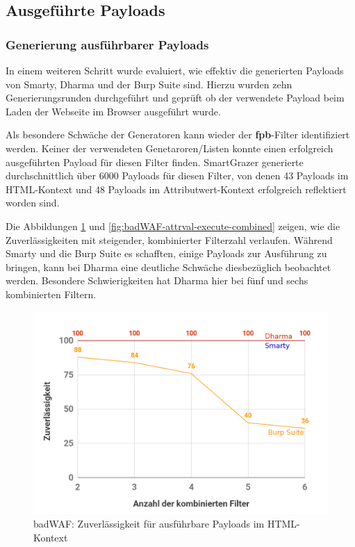 \FloatBarrier
\subsection{Ausgeführte Payloads}

\subsubsection{Generierung ausführbarer Payloads}

In einem weiteren Schritt wurde evaluiert, wie effektiv die generierten Payloads von Smarty, Dharma und der Burp Suite sind. Hierzu wurden zehn Generierungsrunden durchgeführt und geprüft ob der verwendete Payload beim Laden der Webseite im Browser ausgeführt wurde.


Als besondere Schwäche der Generatoren kann wieder der \textbf{fpb}-Filter identifiziert werden. Keiner der verwendeten Genetaroren/Listen konnte einen erfolgreich ausgeführten Payload für diesen Filter finden. SmartGrazer generierte durchschnittlich über 6000 Payloads für diesen Filter, von denen 43 Payloads im HTML-Kontext und 48 Payloads im Attributwert-Kontext erfolgreich reflektiert worden sind.

Die Abbildungen \ref{fig:badWAF-html-execute-combined} und \ref{fig:badWAF-attrval-execute-combined} zeigen, wie die Zuverlässigkeiten mit steigender, kombinierter Filterzahl verlaufen. Während Smarty und die Burp Suite es schafften, einige Payloads zur Ausführung zu bringen, kann bei Dharma eine deutliche Schwäche diesbezüglich beobachtet werden. Besondere Schwierigkeiten hat Dharma hier bei fünf und sechs kombinierten Filtern.

\begin{figure}[htbp] 
	\centering
	\includegraphics[width=\textwidth]{contents/images/BadWAFDiagramReflectedFilterHTMLCombined}
	\caption{badWAF: Zuverlässigkeit für ausführbare Payloads im HTML-Kontext}
	\label{fig:badWAF-html-execute-combined}
\end{figure}

